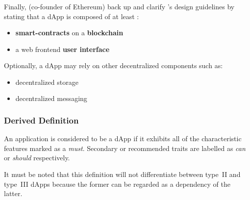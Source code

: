 \subsubsection{\citeyear{Antonopoulos.2018}}
Finally, \citeauthor{Antonopoulos.2018} (co-founder of Ethereum) back up and clarify \citeauthor{EthereumWhitepaper}'s design guidelines by stating that a \ac{dApp} is composed of at least \cite[p.~34]{Antonopoulos.2018}:

\begin{itemize}
  \item \textbf{smart-contracts} on a \textbf{blockchain}
  \item a web frontend \textbf{user interface}
\end{itemize}

Optionally, a \ac{dApp} may rely on other decentralized components such as:

\begin{itemize}
  \item decentralized storage
  \item decentralized messaging
\end{itemize}

\subsubsection{Derived Definition}
\label{sec:derivedDefinition}
An application is considered to be a \acf{dApp} if it exhibits all of the characteristic features marked as a \textit{must}. Secondary or recommended traits are labelled as \textit{can} or \textit{should} respectively. 

It must be noted that this definition will not differentiate between type~II and type~III \acp{dApp} because the former can be regarded as a dependency of the latter.

